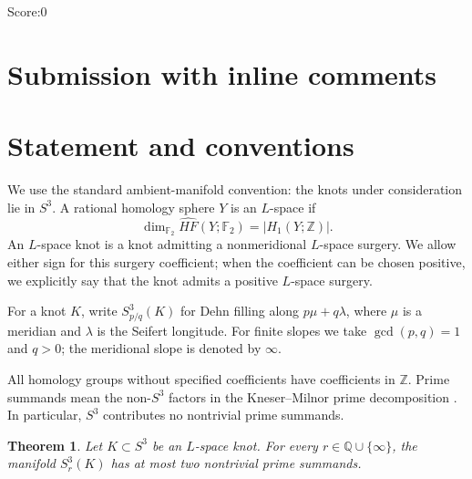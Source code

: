 \documentclass[11pt]{article}
\newcommand{\Z}{\mathbb{Z}}
\newcommand{\F}{\mathbb{F}_2}
\newcommand{\surg}[2]{S^3_{#1}(#2)}
\newtheorem{theorem}{Theorem}
\begin{document}
\noindent Score:0
\newpage
\section{Submission with inline comments}


\begin{abstract}
Every Dehn surgery on an \(L\)-space knot in \(S^3\) has at most two
nontrivial prime summands. We prove this using established results about
reducing slopes and prime decompositions, together with a
group-theoretic genus bound for integer homology sphere summands of
surgeries on fibered knots.
\end{abstract}

\section{Statement and conventions}

We use the standard ambient-manifold convention: the knots under
consideration lie in \(S^3\). A rational homology sphere \(Y\) is an
\(L\)-space if
\[
    \dim_{\F}\widehat{HF}(Y;\F)=|H_1(Y;\Z)|.
\]
An \(L\)-space knot is a knot admitting a nonmeridional \(L\)-space
surgery. We allow either sign for this surgery coefficient; when the
coefficient can be chosen positive, we explicitly say that the knot
admits a positive \(L\)-space surgery.

For a knot \(K\), write \(\surg{p/q}{K}\) for Dehn filling along
\(p\mu+q\lambda\), where \(\mu\) is a meridian and \(\lambda\) is the
Seifert longitude. For finite slopes we take \(\gcd(p,q)=1\) and \(q>0\);
the meridional slope is denoted by \(\infty\).

All homology groups without specified coefficients have coefficients
in \(\Z\). Prime summands mean the non-\(S^3\) factors in the
Kneser--Milnor prime decomposition
\cite[Theorem~1]{Milnor}. In particular, \(S^3\) contributes no
nontrivial prime summands.

\begin{theorem}\label{thm:main}
Let \(K\subset S^3\) be an \(L\)-space knot. For every
\(r\in\mathbb{Q}\cup\{\infty\}\), the manifold \(\surg{r}{K}\) has at most
two nontrivial prime summands.
\end{theorem}
\end{document}
